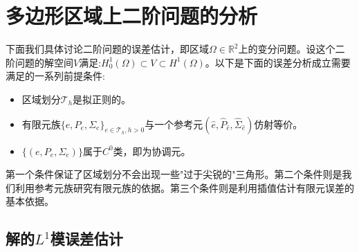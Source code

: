 \section{多边形区域上二阶问题的分析}
下面我们具体讨论二阶问题的误差估计，即区域$\Omega\in\mathbb{R}^{2}$上的变分问题。设这个二阶问题的解空间$V$满足:$H_{0}^{1}(\Omega)\subset V\subset H^{1}(\Omega)$。以下是下面的误差分析成立需要满足的一系列前提条件:
\begin{itemize}
    \item 区域划分$\mathcal{T}_{h}$是拟正则的。
    \item 有限元族$\{e,P_{e},\Sigma_{e}\}_{e\in\mathcal{T}_{h},h>0}$与一个参考元$(\hat{e},\hat{P}_{\hat{e}},\hat{\Sigma}_{\hat{e}})$仿射等价。
    \item $\{(e,P_{e},\Sigma_{e})\}$属于$C^{0}$类，即为协调元。 
\end{itemize}
\begin{remark}
    第一个条件保证了区域划分不会出现一些"过于尖锐的"三角形。第二个条件则是我们利用参考元族研究有限元族的依据。第三个条件则是利用插值估计有限元误差的基本依据。
\end{remark}
\subsection{解的$L^{1}$模误差估计}
